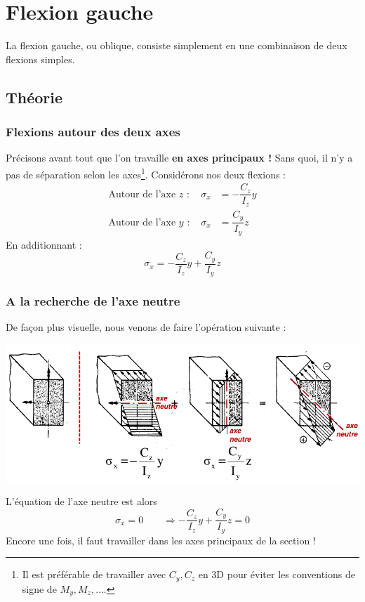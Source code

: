 \chapter{Flexion gauche}
La flexion gauche, ou oblique, consiste simplement en une combinaison de 
deux flexions simples.
\section{Théorie}
	\subsection{Flexions autour des deux axes}
	Précisons avant tout que l'on travaille \textbf{en axes principaux !} 
	Sans quoi, il n'y a pas de séparation selon les axes\footnote{Il est 
	préférable de travailler avec $C_y,C_z$ en 3D pour éviter les 
	conventions de signe de $M_y,M_z,\dots$.}. Considérons nos deux 
	flexions :
	\begin{equation}
	\begin{array}{lll}
	\text{Autour de l'axe $z$ : } & \sigma_x &= -\dfrac{C_z}{I_z}y\\
	\text{Autour de l'axe $y$ : } & \sigma_x &= \dfrac{C_y}{I_y}z	
	\end{array}
	\end{equation}
	En additionnant :
	\begin{equation}
	\displaystyle	\sigma_x = -\dfrac{C_z}{I_z}y + \dfrac{C_y}{I_y}z
	\end{equation}

	\subsection{A la recherche de l'axe neutre}
	De façon plus visuelle, nous venons de faire l'opération suivante : 
	\begin{center}
	\includegraphics[scale=0.4]{ch6/image1.png}
	\end{center}
	L'équation de l'axe neutre est alors 
	\begin{equation}
	\sigma_x = 0\qquad \Longrightarrow -\dfrac{C_z}{I_z}y + \dfrac{C_y
	}{I_y}z=0
	\end{equation}
	\danger Encore une fois, il faut travailler dans les axes principaux 
	de la section !